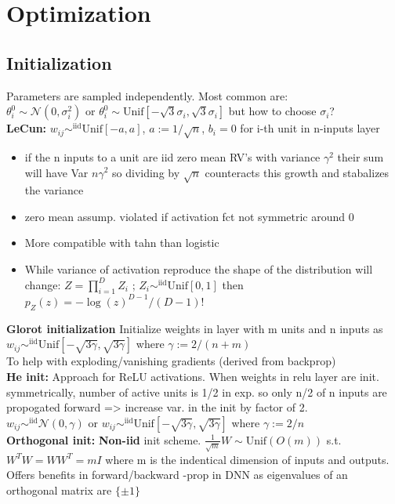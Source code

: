 \section{Optimization}
\subsection{Initialization}
Parameters are sampled independently. Most common are: \\ $\theta_i^0 \sim \mathcal{N}(0,\sigma_i^2)$ or $\theta_i^0 \sim \text{Unif}[-\sqrt{3}\sigma_i, \sqrt{3}\sigma_i]$ but how to choose $\sigma_i$?\\
\textbf{LeCun:} $w_{ij} \sim^{\text{iid}} \text{Unif}[-a,a]$, $a := 1/\sqrt{n}$, $b_i = 0$ for i-th unit in n-inputs layer
\begin{itemize}
    \item if the n inputs to a unit are iid zero mean RV's with variance $\gamma^2$ their sum will have Var $n\gamma^2$ so dividing by $\sqrt{n}$ counteracts this growth and stabalizes the variance
    \item zero mean assump. violated if activation fct not symmetric around 0
    \item More compatible with tahn than logistic
    \item While variance of activation reproduce the shape of the distribution will change: $Z = \prod_{i = 1}^D Z_i$ ; $Z_i \sim^{\text{iid}} \text{Unif}[0,1]$ then $p_Z(z) = -\log(z)^{D-1}/(D-1)!$
\end{itemize}
\textbf{Glorot initialization}
Initialize weights in layer with m units and n inputs as $w_{ij} \sim^{\text{iid}} \text{Unif}[-\sqrt{3\gamma}, \sqrt{3\gamma}]$ where $\gamma := 2/(n+m)$\\
To help with exploding/vanishing gradients (derived from backprop)\\
\textbf{He init: }Approach for ReLU activations. When weights in relu layer are init. symmetrically, number of active units is 1/2 in exp. so only n/2 of n inputs are propogated forward => increase var. in the init by factor of 2.\\
$w_{ij} \sim^{\text{iid}} \mathcal{N}(0,\gamma)$ or $w_{ij} \sim^{\text{iid}} \text{Unif}[-\sqrt{3\gamma}, \sqrt{3\gamma}]$ where $\gamma := 2/n$\\
\textbf{Orthogonal init: } \textbf{Non-iid} init scheme. $\frac{1}{\sqrt{m}}W \sim \text{Unif}(O(m))$ s.t. $W^TW = WW^T = mI$ where m is the indentical dimension of inputs and outputs.\\
Offers benefits in forward/backward -prop in DNN as eigenvalues of an orthogonal matrix are $\{\pm 1\}$
